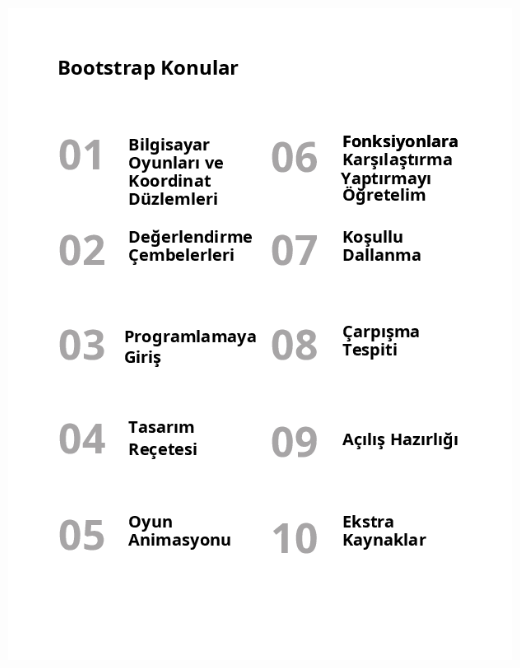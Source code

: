\documentclass[12pt, a4paper]{article}
\begin{document}
\newpage
\includegraphics[width=1\linewidth]{StudentWorkbook_algebra_cover_tr_0-1.png}
\end{document}
